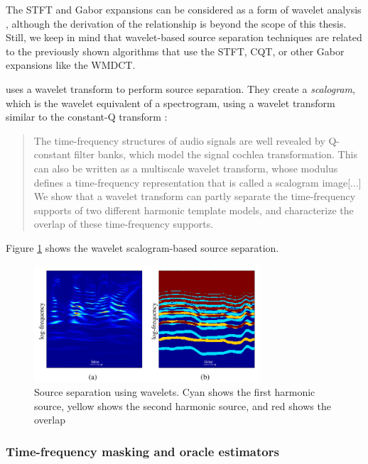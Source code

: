 \documentclass[report.tex]{subfiles}
\begin{document}
The STFT and Gabor expansions can be considered as a form of wavelet analysis \parencite{gaborwavelet1, gaborwavelet2}, although the derivation of the relationship is beyond the scope of this thesis. Still, we keep in mind that wavelet-based source separation techniques are related to the previously shown algorithms that use the STFT, CQT, or other Gabor expansions like the WMDCT.

\textcite{wavelets} uses a wavelet transform to perform source separation. They create a \textit{scalogram}, which is the wavelet equivalent of a spectrogram, using a wavelet transform similar to the constant-Q transform \parencite[2--3]{wavelets}:

\begin{quote}
	The time-frequency structures of audio signals are well revealed by Q-constant filter banks, which model the signal cochlea transformation. This can also be written as a multiscale wavelet transform, whose modulus defines a time-frequency representation that is called a scalogram image[...] We show that a wavelet transform can partly separate the time-frequency supports of two different harmonic template models, and characterize the overlap of these time-frequency supports.
\end{quote}

Figure \ref{fig:waveletsep} shows the wavelet scalogram-based source separation.

\begin{figure}[ht]
	\centering
	\includegraphics[width=0.75\textwidth]{./images-wavelets/wavelet_sep.png}
	\caption{Source separation using wavelets. Cyan shows the first harmonic source, yellow shows the second harmonic source, and red shows the overlap \parencite[5]{wavelets}}
	\label{fig:waveletsep}
\end{figure}

\subsubsection{Time-frequency masking and oracle estimators}
\label{sec:masksandoracles}
\end{document}
